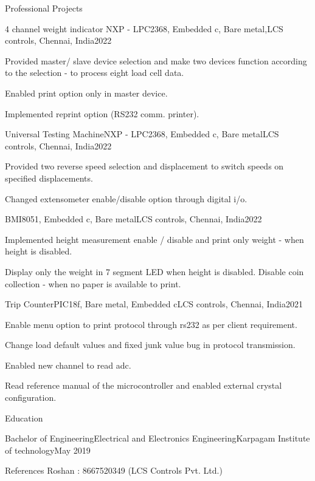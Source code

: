 \documentclass[]{Vetri-Resume}
\begin{document}
\begin{section}{Professional Projects}
\begin{subsection}{4 channel weight indicator }{NXP - LPC2368, Embedded c, Bare metal,}{LCS controls, Chennai, India}{2022}
    \item{ Provided master/ slave device selection and make two devices function according to the selection - to process eight load cell data. 
    \item Enabled print option only in master device.
    \item Implemented reprint option (RS232 comm. printer).}
\end{subsection}

\begin{subsection}{Universal Testing Machine}{NXP - LPC2368, Embedded c, Bare metal}{LCS controls, Chennai, India}{2022}
    \item{ Provided two reverse speed selection and displacement to switch speeds on specified 
    displacements.
    \item Changed extensometer enable/disable option through digital i/o.}
\end{subsection}

\begin{subsection}{BMI}{8051, Embedded c, Bare metal}{LCS controls, Chennai, India}{2022}
    \item{ Implemented height measurement enable / disable and print only weight - when height is disabled.
    \item Display only the weight in 7 segment LED when height is disabled. Disable coin collection - when no paper is available to print.}
\end{subsection}

\begin{subsection}{Trip Counter}{PIC18f, Bare metal, Embedded c}{LCS controls, Chennai, India}{2021}
    \item{Enable menu option to print protocol through rs232 as per client requirement.}
    \item{Change load default values and fixed junk value bug in protocol transmission.}
    \item{Enabled new channel to read adc.}
    \item{Read reference manual of the microcontroller and enabled external crystal configuration.}
\end{subsection}
\end{section}

\begin{section}{Education}
    \begin{subsection}{Bachelor of Engineering}{Electrical and Electronics Engineering}{Karpagam Institute of technology}{May 2019}
    \end{subsection}
\end{section}


\begin{section}{References}
{Roshan : 8667520349 (LCS Controls Pvt. Ltd.)}

\end{section}
\end{document}
